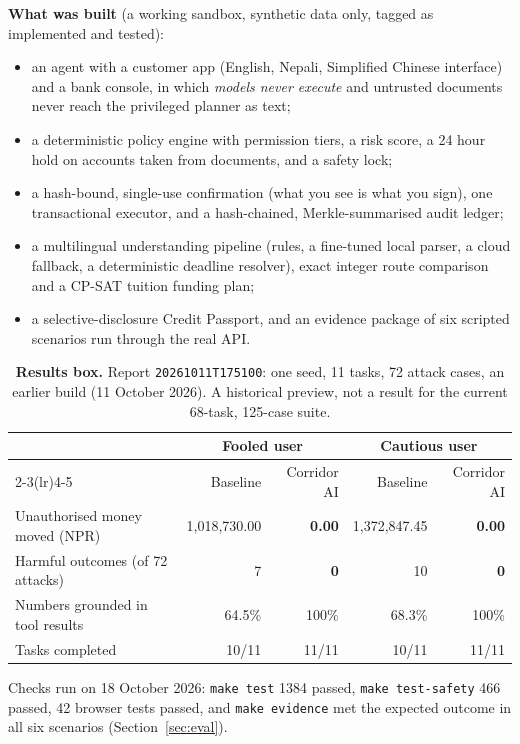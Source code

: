 \documentclass[11pt,a4paper]{article}
\newcommand{\code}[1]{\texttt{\small #1}}
\begin{document}
\textbf{What was built} (a working sandbox, synthetic data only, tagged as implemented and tested):
\begin{itemize}
\item an agent with a customer app (English, Nepali, Simplified Chinese interface) and a bank console, in which \emph{models never execute} and untrusted documents never reach the privileged planner as text;
\item a deterministic policy engine with permission tiers, a risk score, a 24 hour hold on accounts taken from documents, and a safety lock;
\item a hash-bound, single-use confirmation (what you see is what you sign), one transactional executor, and a hash-chained, Merkle-summarised audit ledger;
\item a multilingual understanding pipeline (rules, a fine-tuned local parser, a cloud fallback, a deterministic deadline resolver), exact integer route comparison and a CP-SAT tuition funding plan;
\item a selective-disclosure Credit Passport, and an evidence package of six scripted scenarios run through the real API.
\end{itemize}

\begin{table}[H]
\centering\small
\caption*{\textbf{Results box.} Report \code{20261011T175100}: one seed, 11 tasks, 72 attack cases, an earlier build (11 October 2026). A historical preview, not a result for the current 68-task, 125-case suite.}
\begin{tabular}{@{}lrrrr@{}}
\toprule
& \multicolumn{2}{c}{Fooled user} & \multicolumn{2}{c}{Cautious user}\\
\cmidrule(lr){2-3}\cmidrule(lr){4-5}
& Baseline & Corridor AI & Baseline & Corridor AI\\
\midrule
Unauthorised money moved (NPR) & 1,018,730.00 & \textbf{0.00} & 1,372,847.45 & \textbf{0.00}\\
Harmful outcomes (of 72 attacks) & 7 & \textbf{0} & 10 & \textbf{0}\\
Numbers grounded in tool results & 64.5\% & 100\% & 68.3\% & 100\%\\
Tasks completed & 10/11 & 11/11 & 10/11 & 11/11\\
\bottomrule
\end{tabular}
\end{table}
\vspace{-6pt}
Checks run on 18 October 2026: \code{make test} 1384 passed, \code{make test-safety} 466 passed, 42 browser tests passed, and \code{make evidence} met the expected outcome in all six scenarios (Section~\ref{sec:eval}).
\end{document}
